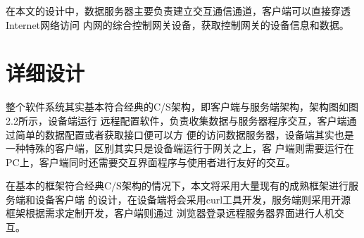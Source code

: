 \documentclass[a4paper,12pt]{report}
\begin{document}
\begin{spacing}{1.5}
在本文的设计中，数据服务器主要负责建立交互通信通道，客户端可以直接穿透Internet网络访问
内网的综合控制网关设备，获取控制网关的设备信息和数据。

\section{详细设计}
整个软件系统其实基本符合经典的C/S架构，即客户端与服务端架构，架构图如图2.2所示，设备端运行
远程配置软件，负责收集数据与服务器程序交互，客户端通过简单的数据配置或者获取接口便可以方
便的访问数据服务器，设备端其实也是一种特殊的客户端，区别其实只是设备端运行于网关之上，客
户端则需要运行在PC上，客户端同时还需要交互界面程序与使用者进行友好的交互。

在基本的框架符合经典C/S架构的情况下，本文将采用大量现有的成熟框架进行服务端和设备客户端
的设计，在设备端将会采用curl工具开发，服务端则采用开源框架根据需求定制开发，客户端则通过
浏览器登录远程服务器界面进行人机交互。

\end{spacing}

\end{document}
